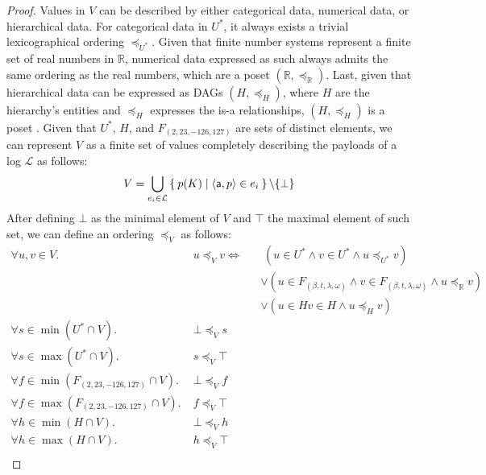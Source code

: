 \begin{proof}
	Values in $V$ can be described by either categorical data, numerical data, or hierarchical data. For categorical data in $U^*$, it always exists a trivial lexicographical ordering $\preceq_{U^*}$. Given that finite number systems represent a finite set of real numbers in $\mathbb{R}$, numerical data expressed as such always admits the same ordering as the real numbers, which are a poset $(\mathbb{R},\preceq_{\mathbb{R}})$. Last, given that hierarchical data can be expressed as DAGs $(H,\preceq_H)$, where $H$ are the hierarchy's entities and $\preceq_H$ expresses the is-a relationships, $(H,\preceq_H)$ is a poset \cite{BergamiBM20}. Given that $U^*$, $H$, and $F_{(2,23,-126,127)}$ are sets of distinct elements, we can represent $V$ as a finite set of values completely describing the payloads of a log $\mathcal{L}$ as follows:
	\[V=\bigcup_{e_i\in \mathcal{L}}\Set{p(K)|\Braket{\mathsf{a}, p}\in e_i}\backslash\{\bot\}\]
	After defining $\bot$ as the minimal element of $V$ and $\top$ the maximal element of such set, we can define an ordering $\preceq_V$ as follows:
	\begin{align*}
	\forall u,v\in V.\; &u\preceq_V v\Leftrightarrow &&\;(u\in U^*\wedge v\in U^*\wedge u\preceq_{U^*}v)\\
	& &&\vee (u\in F_{(\beta,t,\lambda,\omega)}\wedge v\in F_{(\beta,t,\lambda,\omega)}\wedge u\preceq_{\mathbb{R}}v)\\
	& &&\vee (u\in H v\in H\wedge u\preceq_{H}v)\\
\forall s\in\min(U^*\cap V).\;&\bot\preceq_V  s\\
	\forall s\in\max(U^*\cap V).\;&s\preceq_V  \top\\
	\forall f\in\min(F_{(2,23,-126,127)}\cap V).\; &\bot\preceq_V f \\
	\forall f\in\max(F_{(2,23,-126,127)}\cap V).\; &f\preceq_V \top \\
	 \forall h\in \min(H\cap V).\;&\bot\preceq_V  h\\
	 \forall h\in \max(H\cap V).\;&h\preceq_V  \top\\
	\end{align*}
\end{proof}



